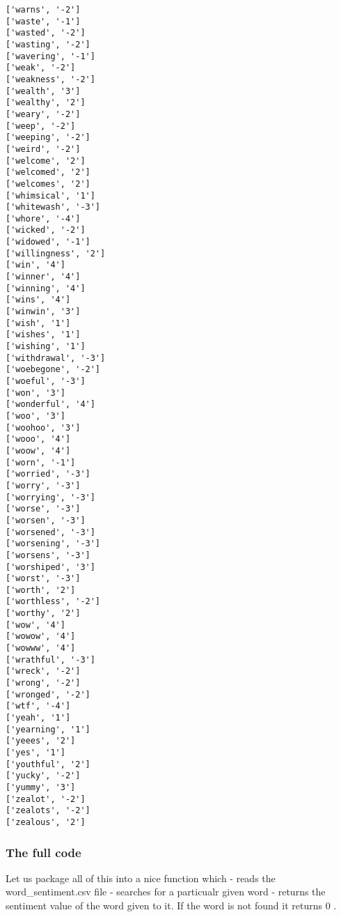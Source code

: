 \documentclass[11pt]{article}
\begin{document}
\begin{Verbatim}[commandchars=\\\{\}]
['warns', '-2']
['waste', '-1']
['wasted', '-2']
['wasting', '-2']
['wavering', '-1']
['weak', '-2']
['weakness', '-2']
['wealth', '3']
['wealthy', '2']
['weary', '-2']
['weep', '-2']
['weeping', '-2']
['weird', '-2']
['welcome', '2']
['welcomed', '2']
['welcomes', '2']
['whimsical', '1']
['whitewash', '-3']
['whore', '-4']
['wicked', '-2']
['widowed', '-1']
['willingness', '2']
['win', '4']
['winner', '4']
['winning', '4']
['wins', '4']
['winwin', '3']
['wish', '1']
['wishes', '1']
['wishing', '1']
['withdrawal', '-3']
['woebegone', '-2']
['woeful', '-3']
['won', '3']
['wonderful', '4']
['woo', '3']
['woohoo', '3']
['wooo', '4']
['woow', '4']
['worn', '-1']
['worried', '-3']
['worry', '-3']
['worrying', '-3']
['worse', '-3']
['worsen', '-3']
['worsened', '-3']
['worsening', '-3']
['worsens', '-3']
['worshiped', '3']
['worst', '-3']
['worth', '2']
['worthless', '-2']
['worthy', '2']
['wow', '4']
['wowow', '4']
['wowww', '4']
['wrathful', '-3']
['wreck', '-2']
['wrong', '-2']
['wronged', '-2']
['wtf', '-4']
['yeah', '1']
['yearning', '1']
['yeees', '2']
['yes', '1']
['youthful', '2']
['yucky', '-2']
['yummy', '3']
['zealot', '-2']
['zealots', '-2']
['zealous', '2']

    \end{Verbatim}

    \subsubsection{The full code}\label{the-full-code}

Let us package all of this into a nice function which - reads the
word\_sentiment.csv file - searches for a particualr given word -
returns the sentiment value of the word given to it. If the word is not
found it returns 0 .
\end{document}

